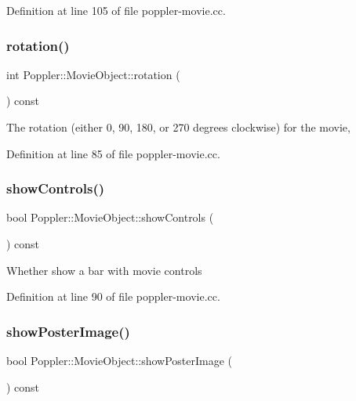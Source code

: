 Definition at line 105 of file poppler-\/movie.\+cc.

\mbox{\label{class_poppler_1_1_movie_object_a7b8bab61a86d68fee6e0470d5fd21e99}} 
\subsubsection{\texorpdfstring{rotation()}{rotation()}}
{\footnotesize\ttfamily int Poppler\+::\+Movie\+Object\+::rotation (\begin{DoxyParamCaption}{ }\end{DoxyParamCaption}) const}

The rotation (either 0, 90, 180, or 270 degrees clockwise) for the movie, 

Definition at line 85 of file poppler-\/movie.\+cc.

\mbox{\label{class_poppler_1_1_movie_object_a2ef9042f47b247ccefffaed387d0218d}} 
\subsubsection{\texorpdfstring{show\+Controls()}{showControls()}}
{\footnotesize\ttfamily bool Poppler\+::\+Movie\+Object\+::show\+Controls (\begin{DoxyParamCaption}{ }\end{DoxyParamCaption}) const}

Whether show a bar with movie controls 

Definition at line 90 of file poppler-\/movie.\+cc.

\mbox{\label{class_poppler_1_1_movie_object_a853c1c14faadf40e0081cbdaca4b6936}} 
\subsubsection{\texorpdfstring{show\+Poster\+Image()}{showPosterImage()}}
{\footnotesize\ttfamily bool Poppler\+::\+Movie\+Object\+::show\+Poster\+Image (\begin{DoxyParamCaption}{ }\end{DoxyParamCaption}) const}


